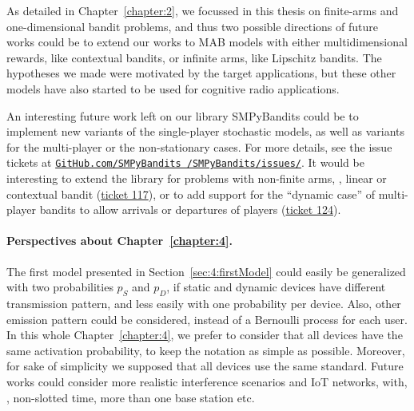 As detailed in Chapter~\ref{chapter:2}, we focussed in this thesis on finite-arms and one-dimensional bandit problems,
and thus two possible directions of future works could be to extend our works
to MAB models with either multidimensional rewards, like contextual bandits, or infinite arms, like Lipschitz bandits.
The hypotheses we made were motivated by the target applications, but these other models have also started to be used for cognitive radio applications.



An interesting future work left on our library SMPyBandits could be to implement new variants of the single-player stochastic models, as well as variants for the multi-player or the non-stationary cases.
For more details, see the issue tickets at \href{https://github.com/SMPyBandits/SMPyBandits/issues/}{\texttt{GitHub.com/SMPyBandits /SMPyBandits/issues/}}.
%
It would be interesting to extend the library for problems with non-finite arms, \eg, linear or contextual bandit (\href{https://github.com/SMPyBandits/SMPyBandits/issues/117}{ticket 117}),
or to add support for the ``dynamic case'' of multi-player bandits to allow arrivals or departures of players (\href{https://github.com/SMPyBandits/SMPyBandits/issues/124}{ticket 124}).



\paragraph{Perspectives about \textbf{Chapter~\ref{chapter:4}}.}




The first model presented in Section~\ref{sec:4:firstModel} could easily be generalized with two probabilities $p_S$ and $p_D$, if static and dynamic devices have different transmission pattern, and less easily with one probability per device. Also, other emission pattern could be considered, instead of a Bernoulli process for each user.
In this whole Chapter~\ref{chapter:4}, we prefer to consider that all devices have the same activation probability, to keep the notation as simple as possible.
%
Moreover, for sake of simplicity we supposed that all devices use the same standard.
Future works could consider more realistic interference scenarios and IoT networks, with, \eg, non-slotted time, more than one base station etc.

